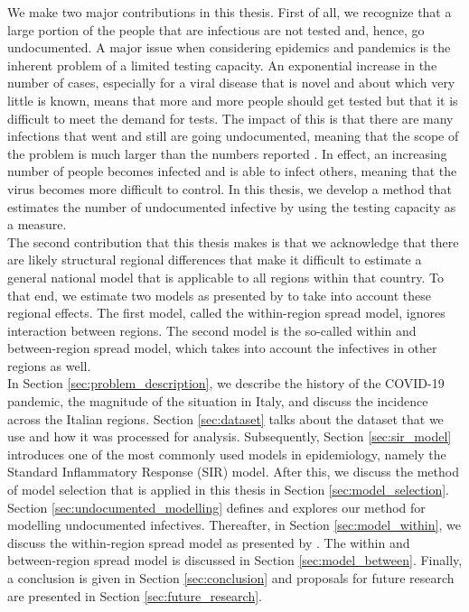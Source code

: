 \documentclass[12pt]{article}
\begin{document}
	We make two major contributions in this thesis. First of all, we recognize that a large portion of the people that are infectious are not tested and, hence, go undocumented. A major issue when considering epidemics and pandemics is the inherent problem of a limited testing capacity. An exponential increase in the number of cases, especially for a viral disease that is novel and about which very little is known, means that more and more people should get tested but that it is difficult to meet the demand for tests. The impact of this is that there are many infections that went and still are going undocumented, meaning that the scope of the problem is much larger than the numbers reported \parencite{li2020undocumented}. In effect, an increasing number of people becomes infected and is able to infect others, meaning that the virus becomes more difficult to control. In this thesis, we develop a method that estimates the number of undocumented infective by using the testing capacity as a measure. \\
	
	The second contribution that this thesis makes is that we acknowledge that there are likely structural regional differences that make it difficult to estimate a general national model that is applicable to all regions within that country. To that end, we estimate two models as presented by \textcite{adda2016economic} to take into account these regional effects. The first model, called the within-region spread model, ignores interaction between regions. The second model is the so-called within and between-region spread model, which takes into account the infectives in other regions as well. \\
	
	In Section \ref{sec:problem_description}, we describe the history of the COVID-19 pandemic, the magnitude of the situation in Italy, and discuss the incidence across the Italian regions. Section \ref{sec:dataset} talks about the dataset that we use and how it was processed for analysis. Subsequently, Section \ref{sec:sir_model} introduces one of the most commonly used models in epidemiology, namely the Standard Inflammatory Response (SIR) model. After this, we discuss the method of model selection that is applied in this thesis in Section \ref{sec:model_selection}. Section \ref{sec:undocumented_modelling} defines and explores our method for modelling undocumented infectives. Thereafter, in Section \ref{sec:model_within}, we discuss the within-region spread model as presented by \textcite{adda2016economic}. The within and between-region spread model is discussed in Section \ref{sec:model_between}. Finally, a conclusion is given in Section \ref{sec:conclusion} and proposals for future research are presented in Section \ref{sec:future_research}.
	
\end{document}
